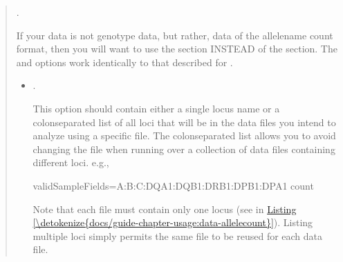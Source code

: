 \documentclass[letterpaper,10pt,english,openany,oneside]{sphinxmanual}
\begin{document}
\begin{quote}
\begin{itemize}
\end{itemize}

\sphinxAtStartPar
\sphinxcode{\sphinxupquote{{[}ParseAlleleCountFile{]}}}.

\sphinxAtStartPar
If your data is not genotype data, but rather, data of the
allele\sphinxhyphen{}name count format, then you will want to use the
\sphinxcode{\sphinxupquote{{[}ParseAlleleCountFile{]}}} section INSTEAD of the
\sphinxcode{\sphinxupquote{{[}ParseGenotypeFile{]}}} section. The  and
 options work identically to that described for
\sphinxcode{\sphinxupquote{{[}ParseGenotypeFile{]}}}.
\begin{itemize}
\item {} 
\sphinxAtStartPar
{}.

\sphinxAtStartPar
This option should contain either a single locus name or a
colon\sphinxhyphen{}separated list of all loci that will be in the data files
you intend to analyze using a specific  file. The
colon\sphinxhyphen{}separated list allows you to avoid changing the 
file when running over a collection of data files containing
different loci. e.g.,

\begin{sphinxVerbatim}[commandchars=\\\{\}]
validSampleFields=A:B:C:DQA1:DQB1:DRB1:DPB1:DPA1
 count
\end{sphinxVerbatim}

\sphinxAtStartPar
Note that each  file must contain only one locus (see
 in
\hyperref[\detokenize{docs/guide-chapter-usage:data-allelecount}]{Listing \ref{\detokenize{docs/guide-chapter-usage:data-allelecount}}}). Listing multiple loci
simply permits the same  file to be reused for each data
file.

\end{itemize}
\end{quote}
\end{document}
